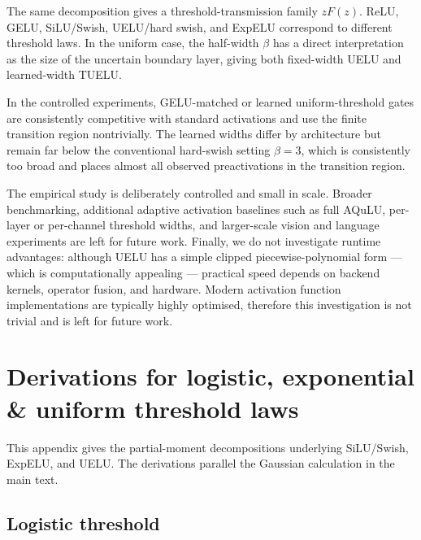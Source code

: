 \documentclass[11pt]{article}
\begin{document}
The same decomposition gives a threshold-transmission family $zF(z)$. ReLU, GELU, SiLU/Swish, UELU/hard swish, and ExpELU correspond to different threshold laws. In the uniform case, the half-width $\beta$ has a direct interpretation as the size of the uncertain boundary layer, giving both fixed-width UELU and learned-width TUELU.

In the controlled experiments, GELU-matched or learned uniform-threshold gates are consistently competitive with standard activations and use the finite transition region nontrivially. The learned widths differ by architecture but remain far below the conventional hard-swish setting $\beta=3$, which is consistently too broad and places almost all observed preactivations in the transition region. 

The empirical study is deliberately controlled and small in scale. 
Broader benchmarking, additional adaptive activation baselines such as full AQuLU, per-layer or per-channel threshold widths, and larger-scale vision and language experiments are left for future work. 
Finally, we do not investigate runtime advantages: although UELU has a simple clipped piecewise-polynomial form --- which is computationally appealing --- practical speed depends on backend kernels, operator fusion, and hardware. Modern activation function implementations are typically highly optimised, therefore this investigation is not trivial and is left for future work. 


\appendix

\section{Derivations for logistic, exponential \& uniform threshold laws}
\label{app:alternative-activations}

This appendix gives the partial-moment decompositions underlying SiLU/Swish, ExpELU, and UELU. The derivations parallel the Gaussian calculation in the main text.

\subsection{Logistic threshold}
\end{document}
